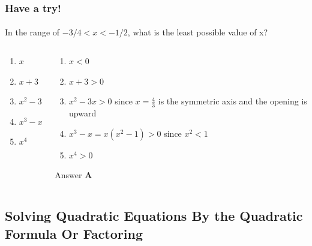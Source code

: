 \documentclass[
	11pt, %
]{beamer}
\begin{document}
\begin{frame}
	\frametitle{Have a try!}
	\framesubtitle{}

In the range of $-3/4 < x < -1/2$, what is the least possible value of x?
\bigskip
	\begin{columns}[t] 
		\begin{column}{0.45\textwidth} %
			\begin{enumerate}[A]
				\item $x$
				\item $x + 3$
				\item $x^2 -3x$
				\item $x^3 - x$
				\item $x^4$
			\end{enumerate}
		\end{column}
		\begin{column}{0.5\textwidth} %
		  \pause
			\begin{enumerate}[A]
				\item $x <0$ 
				\item $x + 3 >0$ 
				\item $x^2 -3x>0$ since $x=\frac{4}{3}$ is the symmetric axis and the opening is upward
				\item $x^3 - x= x(x^2 - 1) >0$ since $x^2 <1$
				\item $x^4>0$
			\end{enumerate}
		\bigskip
    Answer \textbf{A}
    \end{column}
	\end{columns}
\end{frame}


\subsection{Solving Quadratic Equations By the Quadratic Formula Or Factoring}

\end{document}
